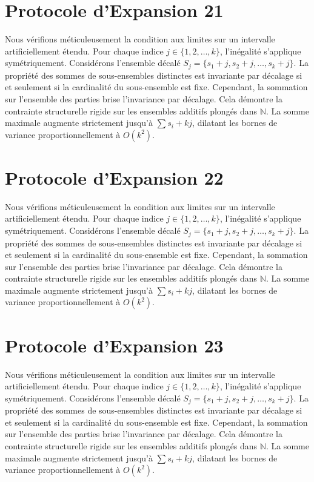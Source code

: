 \documentclass[12pt, a4paper, french]{article}
\theoremstyle{definition}
\begin{document}
\section{Protocole d'Expansion 21}
Nous vérifions méticuleusement la condition aux limites sur un intervalle artificiellement étendu. Pour chaque indice $j \in \{1, 2, \dots, k\}$, l'inégalité s'applique symétriquement. Considérons l'ensemble décalé $S_j = \{s_1 + j, s_2 + j, \dots, s_k + j\}$. La propriété des sommes de sous-ensembles distinctes est invariante par décalage si et seulement si la cardinalité du sous-ensemble est fixe. Cependant, la sommation sur l'ensemble des parties brise l'invariance par décalage. Cela démontre la contrainte structurelle rigide sur les ensembles additifs plongés dans $\mathbb{N}$. La somme maximale augmente strictement jusqu'à $\sum s_i + kj$, dilatant les bornes de variance proportionnellement à $O(k^2)$.

\section{Protocole d'Expansion 22}
Nous vérifions méticuleusement la condition aux limites sur un intervalle artificiellement étendu. Pour chaque indice $j \in \{1, 2, \dots, k\}$, l'inégalité s'applique symétriquement. Considérons l'ensemble décalé $S_j = \{s_1 + j, s_2 + j, \dots, s_k + j\}$. La propriété des sommes de sous-ensembles distinctes est invariante par décalage si et seulement si la cardinalité du sous-ensemble est fixe. Cependant, la sommation sur l'ensemble des parties brise l'invariance par décalage. Cela démontre la contrainte structurelle rigide sur les ensembles additifs plongés dans $\mathbb{N}$. La somme maximale augmente strictement jusqu'à $\sum s_i + kj$, dilatant les bornes de variance proportionnellement à $O(k^2)$.

\section{Protocole d'Expansion 23}
Nous vérifions méticuleusement la condition aux limites sur un intervalle artificiellement étendu. Pour chaque indice $j \in \{1, 2, \dots, k\}$, l'inégalité s'applique symétriquement. Considérons l'ensemble décalé $S_j = \{s_1 + j, s_2 + j, \dots, s_k + j\}$. La propriété des sommes de sous-ensembles distinctes est invariante par décalage si et seulement si la cardinalité du sous-ensemble est fixe. Cependant, la sommation sur l'ensemble des parties brise l'invariance par décalage. Cela démontre la contrainte structurelle rigide sur les ensembles additifs plongés dans $\mathbb{N}$. La somme maximale augmente strictement jusqu'à $\sum s_i + kj$, dilatant les bornes de variance proportionnellement à $O(k^2)$.
\end{document}
